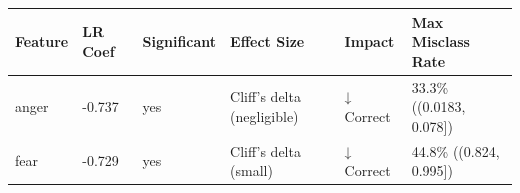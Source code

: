 \begin{tabular}{llllll}
\toprule
Feature & LR Coef & Significant & Effect Size & Impact & Max Misclass Rate \\
\midrule
anger & -0.737 & yes & Cliff's delta (negligible) & ↓ Correct & 33.3\% ((0.0183, 0.078]) \\
fear & -0.729 & yes & Cliff's delta (small) & ↓ Correct & 44.8\% ((0.824, 0.995]) \\
\bottomrule
\end{tabular}
